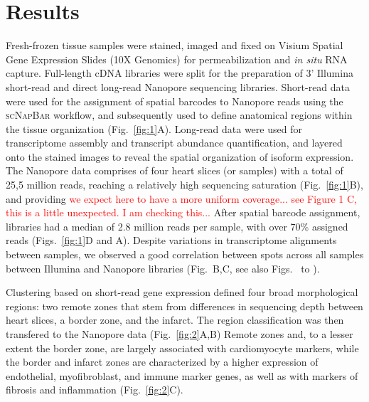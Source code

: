 \documentclass[utf8]{FrontiersinHarvard} %
\newcommand{\insi}{\textit{in situ}\xspace}
\newcommand{\scn}{\textsc{scNapBar}\xspace}
\newcommand*{\red}{\textcolor{red}}
\begin{document}


\section*{Results}
Fresh-frozen tissue samples were stained, imaged and fixed on Visium Spatial Gene Expression Slides (10X Genomics) for permeabilization and \insi RNA capture.
Full-length cDNA libraries were split for the preparation of 3' Illumina short-read and direct long-read Nanopore sequencing libraries.
Short-read data were used for the assignment of spatial barcodes to Nanopore reads using the \scn workflow, and subsequently used to define anatomical regions within the tissue organization (Fig.~\ref{fig:1}A).
Long-read data were used for transcriptome assembly and transcript abundance quantification, and layered onto the stained images to reveal the spatial organization of isoform expression.
The Nanopore data comprises of four heart slices (or samples) with a total of 25,5 million reads, reaching a relatively high sequencing saturation (Fig.~\ref{fig:1}B), and providing \red{we expect here to have a more uniform coverage... see Figure 1 C, this is a little unexpected. I am checking this...}
After spatial barcode assignment, libraries had a median of 2.8 million reads per sample, with over 70\% assigned reads (Figs.~\ref{fig:1}D and A).
Despite variations in transcriptome alignments between samples, we observed a good correlation between spots across all samples between Illumina and Nanopore libraries (Fig.~B,C, see also Figs.~ to ).

Clustering based on short-read gene expression defined four broad morphological regions: two remote zones that stem from differences in sequencing depth between heart slices, a border zone, and the infarct. 
The region classification was then transfered to the Nanopore data (Fig.~\ref{fig:2}A,B)
Remote zones and, to a lesser extent the border zone, are largely associated with cardiomyocyte markers, while the border and infarct zones are characterized by a higher expression of endothelial, myofibroblast, and immune marker genes, as well as with markers of fibrosis and inflammation (Fig.~\ref{fig:2}C).
\end{document}
